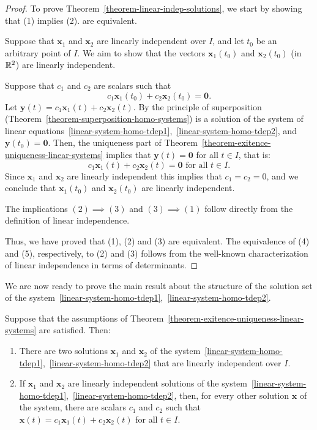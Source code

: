 \begin{proof} To prove Theorem~\ref{theorem-linear-indep-solutions}, we start by showing that (1) implies (2). are equivalent. 

Suppose that $\mathbf{x}_1$ and $\mathbf{x}_2$ are linearly independent over $I$, and let $t_0$ be an arbitrary point of $I$. We aim to show that the vectors $\mathbf{x}_1(t_0)$ and $\mathbf{x}_2(t_0)$ (in $\mathbb{R}^2$) are linearly independent.

Suppose that $c_1$ and $c_2$ are scalars such that
\[
c_1\mathbf{x}_1(t_0)+c_2\mathbf{x}_2(t_0)=\mathbf{0}.
\] 
Let $\mathbf{y}(t)=c_1\mathbf{x}_1(t)+c_2\mathbf{x}_2(t)$. By the principle of superposition (Theorem~\ref{theorem-superposition-homo-systems}) is a solution of the system of linear equations~\eqref{linear-system-homo-tdep1},~\eqref{linear-system-homo-tdep2}, and $\mathbf{y}(t_0)=\mathbf{0}$. Then, the uniqueness part of Theorem~\ref{theorem-exitence-uniqueness-linear-systems} implies that $\mathbf{y}(t)=\mathbf{0}$ for all $t\in I$, that is:
\[
c_1\mathbf{x}_1(t)+c_2\mathbf{x}_2(t)=\mathbf{0}\text{ for all $t\in I$}.
\]
Since $\mathbf{x}_1$ and $\mathbf{x}_2$ are linearly independent this implies that $c_1=c_2=0$, and we conclude that $\mathbf{x}_1(t_0)$ and $\mathbf{x}_2(t_0)$ are linearly independent.

The implications  $(2)\implies(3)$  and $(3)\implies(1)$ follow directly from the definition of linear independence.

Thus, we have proved that (1), (2) and (3) are equivalent. The equivalence of (4) and (5), respectively, to (2) and (3) follows from the well-known characterization of linear independence in terms of determinants.
\end{proof}

We are now ready to prove the main result about the structure of the solution set of the system~\eqref{linear-system-homo-tdep1},~\eqref{linear-system-homo-tdep2}.

\begin{theorem} Suppose that the assumptions of Theorem~\ref{theorem-exitence-uniqueness-linear-systems} are satisfied. Then:
\begin{enumerate}
\item There are two solutions $\mathbf{x}_1$ and $\mathbf{x}_2$ of the system~\eqref{linear-system-homo-tdep1},~\eqref{linear-system-homo-tdep2} that are linearly independent over $I$.
\item If $\mathbf{x}_1$ and $\mathbf{x}_2$ are linearly independent solutions of the system~\eqref{linear-system-homo-tdep1},~\eqref{linear-system-homo-tdep2}, then, for every other solution $\mathbf{x}$ of the system, there are scalars $c_1$ and $c_2$ such that $\mathbf{x}(t)=c_1\mathbf{x}_1(t)+c_2\mathbf{x}_2(t)$ for all $t\in I$.
\end{enumerate}
\end{theorem}


